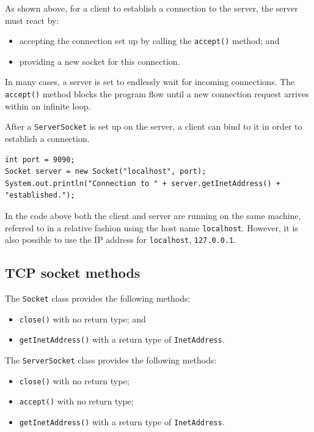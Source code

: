 \documentclass[a4paper]{systems-software}
\begin{document}
As shown above, for a client to establish a connection to the server, the server must react by:
\begin{itemize}
	\item accepting the connection set up by calling the \texttt{accept()} method; and
	\item providing a new socket for this connection.
\end{itemize}

In many cases, a server is set to endlessly wait for incoming connections. The \texttt{accept()} method blocks the program flow until a new connection request arrives within an infinite loop.

After a \texttt{ServerSocket} is set up on the server, a client can bind to it in order to establish a connection.

\begin{lstlisting}[title={Client: establishing connection to the server.}]
int port = 9090;
Socket server = new Socket("localhost", port);
System.out.println("Connection to " + server.getInetAddress() + "established.");
\end{lstlisting}

In the code above both the client and server are running on the same machine, referred to in a relative fashion using the host name \texttt{localhost}. However, it is also possible to use the IP address for \texttt{localhost}, \texttt{127.0.0.1}.


\newpage

\subsection*{TCP socket methods}

The \texttt{Socket} class provides the following methods:
\begin{itemize}
	\item \texttt{close()} with no return type; and
	\item \texttt{getInetAddress()} with a return type of \texttt{InetAddress}.
\end{itemize}

The \texttt{ServerSocket} class provides the following methods:
\begin{itemize}
	\item \texttt{close()} with no return type;
	\item \texttt{accept()} with no return type;
	\item \texttt{getInetAddress()} with a return type of \texttt{InetAddress}.
\end{itemize}
\end{document}
